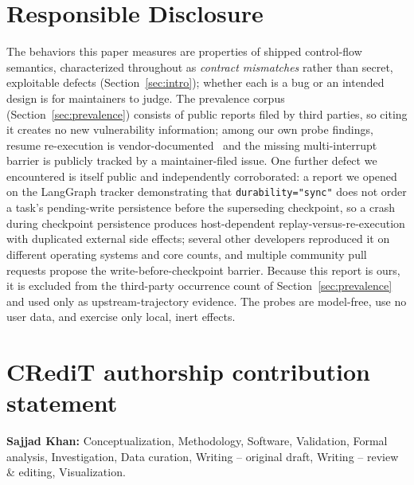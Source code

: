 \documentclass[10pt,journal,compsoc]{IEEEtran}
\begin{document}
\section{Responsible Disclosure}
\label{app:disclosure}
The behaviors this paper measures are properties of shipped control-flow
semantics, characterized throughout as \emph{contract mismatches} rather than
secret, exploitable defects (Section~\ref{sec:intro}); whether each is a bug or
an intended design is for maintainers to judge. The prevalence corpus
(Section~\ref{sec:prevalence}) consists of public reports filed by third
parties, so citing it creates no new vulnerability information; among our own
probe findings, resume re-execution is vendor-documented~\cite{lgdocs26} and
the missing multi-interrupt barrier is publicly tracked by a maintainer-filed
issue. One further defect we encountered is itself public and independently
corroborated: a report we opened on the LangGraph
tracker demonstrating that \texttt{durability="sync"} does not order a task's
pending-write persistence before the superseding checkpoint, so a crash during
checkpoint persistence produces host-dependent replay-versus-re-execution with
duplicated external side effects; several other developers reproduced it on
different operating systems and core counts, and multiple community pull
requests propose the write-before-checkpoint barrier. Because this report is
ours, it is excluded from the third-party occurrence count of
Section~\ref{sec:prevalence} and used only as upstream-trajectory evidence.
The probes are model-free,
use no user data, and exercise only local, inert effects.


\section*{CRediT authorship contribution statement}
\textbf{Sajjad Khan:} Conceptualization, Methodology, Software, Validation,
Formal analysis, Investigation, Data curation, Writing -- original draft,
Writing -- review \& editing, Visualization.
\end{document}
